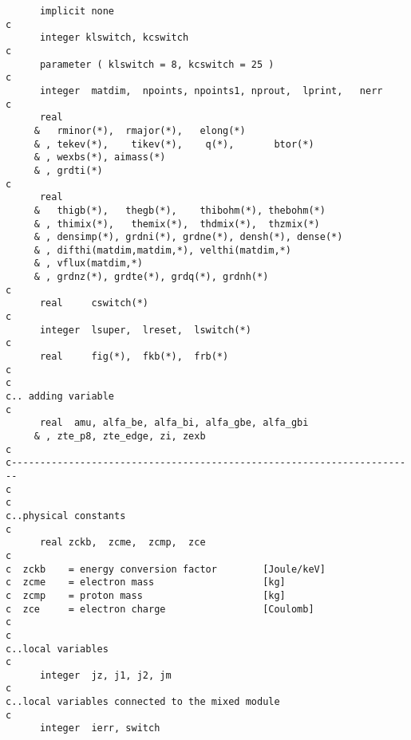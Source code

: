 \begin{verbatim}
      implicit none
c
      integer klswitch, kcswitch
c
      parameter ( klswitch = 8, kcswitch = 25 )
c
      integer  matdim,  npoints, npoints1, nprout,  lprint,   nerr
c
      real
     &   rminor(*),  rmajor(*),   elong(*)
     & , tekev(*),    tikev(*),    q(*),       btor(*)
     & , wexbs(*), aimass(*)
     & , grdti(*)    
c
      real  
     &   thigb(*),   thegb(*),    thibohm(*), thebohm(*)
     & , thimix(*),   themix(*),  thdmix(*),  thzmix(*)
     & , densimp(*), grdni(*), grdne(*), densh(*), dense(*) 
     & , difthi(matdim,matdim,*), velthi(matdim,*)
     & , vflux(matdim,*)
     & , grdnz(*), grdte(*), grdq(*), grdnh(*) 
c
      real     cswitch(*)
c
      integer  lsuper,  lreset,  lswitch(*)
c
      real     fig(*),  fkb(*),  frb(*)
c
c
c.. adding variable 
c
      real  amu, alfa_be, alfa_bi, alfa_gbe, alfa_gbi 
     & , zte_p8, zte_edge, zi, zexb
c
c-----------------------------------------------------------------------
c
c
c..physical constants
c
      real zckb,  zcme,  zcmp,  zce
c
c  zckb    = energy conversion factor        [Joule/keV]
c  zcme    = electron mass                   [kg]
c  zcmp    = proton mass                     [kg]
c  zce     = electron charge                 [Coulomb]
c
c
c..local variables
c
      integer  jz, j1, j2, jm
c
c..local variables connected to the mixed module
c
      integer  ierr, switch


\end{verbatim}
